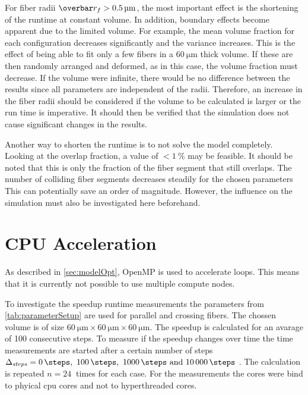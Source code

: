 %
For fiber radii $\fiberRadiusMean > \SI{0.5}{\micro\meter}$, the most important effect is the shortening of the runtime at constant volume.
In addition, boundary effects become apparent due to the limited volume.
For example, the mean volume fraction for each configuration decreases significantly and the variance increases.
This is the effect of being able to fit only a few fibers in a $\SI{60}{\micro\meter}$ thick volume.
If these are then randomly arranged and deformed, as in this case, the volume fraction must decrease.
If the volume were infinite, there would be no difference between the results since all parameters are independent of the radii.
Therefore, an increase in the fiber radii should be considered if the volume to be calculated is larger or the run time is imperative.
It should then be verified that the simulation does not cause significant changes in the results.
\par
%
Another way to shorten the runtime is to not solve the model completely.
Looking at the overlap fraction, a value of $<\SI{1}{\percent}$ may be feasible.
It should be noted that this is only the fraction of the fiber segment that still overlaps.
The number of colliding fiber segments decreases steadily for the chosen parameters
This can potentially save an order of magnitude.
However, the influence on the simulation must also be investigated here beforehand.
%
%
%
\section{CPU Acceleration}
%
As described in \cref{sec:modelOpt}, \ac{OpenMP} is used to accelerate  loops.
This means that it is currently not possible to use multiple compute nodes.
\par
% 
To investigate the speedup runtime measurements the parameters from \cref{tab:parameterSetup} are used for parallel and crossing fibers.
The chossen volume is of size $\SI{60}{\micro\meter} \times \SI{60}{\micro\meter} \times \SI{60}{\micro\meter}$.
The speedup is calculated for an avarage of 100 consecutive steps.
To measure if the speedup changes over time the time measurements are started after a certain number of steps $\Delta_{\mathit{steps}} = \SIlist{0;100;1000;10000}{\steps}$ .
The calculation is repeated $n=\SI{24}{}$ times for each case.
For the measurements the cores were bind to phyical cpu cores and not to hyperthreaded cores.
%
% 
% 
